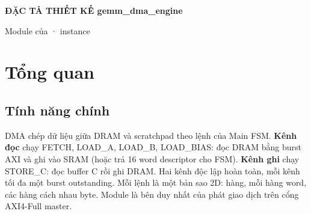\documentclass[10pt,a4paper]{article}
\begin{document}
{\Large\bfseries ĐẶC TẢ THIẾT KẾ gemm\_dma\_engine}\par
\vspace{2pt}
{\small\color{muted}Module của  · instance }\par
\tableofcontents
\clearpage

\section{Tổng quan}
\subsection{Tính năng chính}\label{sec:1}

DMA chép dữ liệu giữa DRAM và scratchpad theo lệnh của Main FSM. \textbf{Kênh đọc} chạy FETCH, LOAD\_A, LOAD\_B, LOAD\_BIAS: đọc DRAM bằng burst AXI và ghi vào SRAM (hoặc trả 16 word descriptor cho FSM). \textbf{Kênh ghi} chạy STORE\_C: đọc buffer C rồi ghi DRAM. Hai kênh độc lập hoàn toàn, mỗi kênh tối đa một burst outstanding. Mỗi lệnh là một bản sao 2D:  hàng, mỗi hàng  word, các hàng cách nhau  byte. Module là bên duy nhất của  phát giao dịch trên cổng AXI4-Full master.
\end{document}
